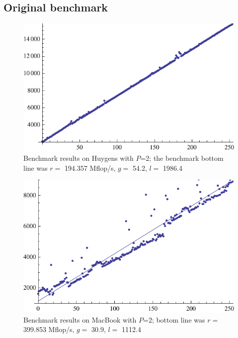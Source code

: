 \documentclass[a4paper]{article}
\begin{document}
\subsection{Original benchmark}
\begin{figure}[h]
    \begin{center}
        \includegraphics{img/bench-huy-put-p2.pdf}
    \end{center}
    \caption{Benchmark results on Huygens with $P$=2; the benchmark bottom line
    was $r=$ 194.357 Mflop/s, $g=$ 54.2, $l=$ 1986.4}
    \label{fig:bench-huy-put-p2}
\end{figure}

\begin{figure}[h]
    \begin{center}
        \includegraphics{img/bench-laptop-put.pdf}
    \end{center}
    \caption{Benchmark results on MacBook with $P$=2; bottom line was  $r=$
    399.853 Mflop/s, $g=$ 30.9, $l=$ 1112.4 }
    \label{fig:bench-laptop-put-p2}
\end{figure}
\end{document}
